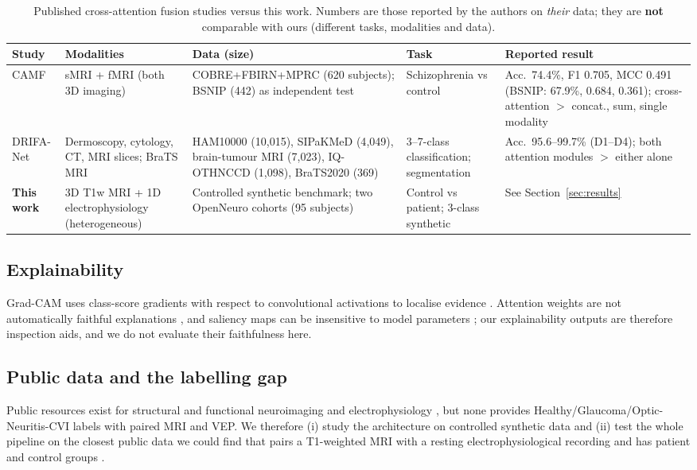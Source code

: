 \begin{table}[!t]
\caption{Published cross-attention fusion studies versus this work. Numbers are those reported by the authors on \emph{their} data; they are \textbf{not} comparable with ours (different tasks, modalities and data).}
\label{tab:lit}
\centering\footnotesize
\begin{tabular}{@{}p{}p{}p{}p{}p{}@{}}
\toprule
Study & Modalities & Data (size) & Task & Reported result\\
\midrule
CAMF \cite{zhou2024camf} & sMRI + fMRI (both 3D imaging) & COBRE+FBIRN+MPRC (620 subjects); BSNIP (442) as independent test & Schizophrenia vs control & Acc.\ 74.4\%, F1 0.705, MCC 0.491 (BSNIP: 67.9\%, 0.684, 0.361); cross-attention $>$ concat., sum, single modality\\
DRIFA-Net \cite{dhar2025drifa} & Dermoscopy, cytology, CT, MRI slices; BraTS MRI & HAM10000 (10{,}015), SIPaKMeD (4{,}049), brain-tumour MRI (7{,}023), IQ-OTHNCCD (1{,}098), BraTS2020 (369) & 3--7-class classification; segmentation & Acc.\ 95.6--99.7\% (D1--D4); both attention modules $>$ either alone\\
\textbf{This work} & 3D T1w MRI + 1D electrophysiology (heterogeneous) & Controlled synthetic benchmark; two OpenNeuro cohorts (95 subjects) & Control vs patient; 3-class synthetic & See Section~\ref{sec:results}\\
\bottomrule
\end{tabular}
\end{table}

\subsection{Explainability}
Grad-CAM uses class-score gradients with respect to convolutional activations to localise evidence \cite{selvaraju2017}. Attention weights are not automatically faithful explanations \cite{jain2019,wiegreffe2019}, and saliency maps can be insensitive to model parameters \cite{adebayo2018}; our explainability outputs are therefore inspection aids, and we do not evaluate their faithfulness here.

\subsection{Public data and the labelling gap}
Public resources exist for structural and functional neuroimaging and electrophysiology \cite{vanessen2013,benson2018,lamontagne2019,gramfort2013,goldberger2000}, but none provides Healthy/Glaucoma/Optic-Neuritis-CVI labels with paired MRI and VEP. We therefore (i) study the architecture on controlled synthetic data and (ii) test the whole pipeline on the closest public data we could find that pairs a T1-weighted MRI with a resting electrophysiological recording and has patient and control groups \cite{liuzzi2022ds003568,ds007181}.

